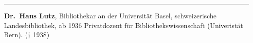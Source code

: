 \begin{center}\rule{0.5\linewidth}{\linethickness}\end{center}

\textbf{Dr.~Hans Lutz}, Bibliothekar an der Universität Basel,
schweizerische Landesbibliothek, ab 1936 Privatdozent für
Bibliothekswissenschaft (Univeristät Bern). († 1938)
